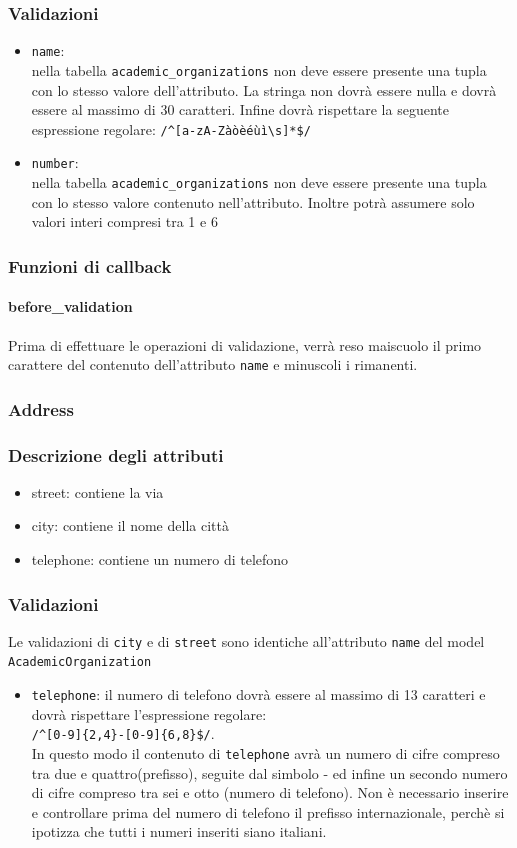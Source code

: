 \documentclass[11pt,a4paper]{article}
\begin{document}
\subsubsection*{Validazioni}
\begin{itemize}
 \item \verb|name|:\\ nella tabella \verb|academic_organizations| non deve essere presente una tupla con lo stesso valore dell'attributo. La stringa non dovrà essere nulla e dovrà essere al massimo di 30 caratteri. Infine dovrà rispettare la seguente espressione regolare: \verb|/^[a-zA-Zàòèéùì\s]*$/|
\item \verb|number|:\\ nella tabella \verb|academic_organizations| non deve essere presente una tupla con lo stesso valore contenuto nell'attributo. Inoltre potrà assumere solo valori interi compresi tra 1 e 6
\end{itemize}
\subsubsection*{Funzioni di callback}
\paragraph{before\_validation}
Prima di effettuare le operazioni di validazione, verrà reso maiscuolo il primo carattere del contenuto dell'attributo \verb|name| e minuscoli i rimanenti.
\subsubsection{Address}
\subsubsection*{Descrizione degli attributi}
\begin{itemize}
 \item street: contiene la via  
 \item city: contiene il nome della città
 \item telephone: contiene un numero di telefono
\end{itemize}
\subsubsection*{Validazioni}
Le validazioni di \verb|city| e di \verb|street| sono identiche all'attributo \verb|name| del model \verb|AcademicOrganization|
\begin{itemize}
 \item \verb|telephone|: il numero di telefono dovrà essere al massimo di 13 caratteri e dovrà rispettare l'espressione regolare:\\
 \verb|/^[0-9]{2,4}-[0-9]{6,8}$/|.\\  
In questo modo il contenuto di \verb|telephone| avrà un numero di cifre compreso tra due e quattro(prefisso), seguite dal simbolo - ed infine un secondo numero di cifre compreso tra sei e otto (numero di telefono). Non è necessario inserire e controllare prima del numero di telefono il prefisso internazionale, perchè si ipotizza che tutti i numeri inseriti siano italiani.
\end{itemize}
\end{document}

